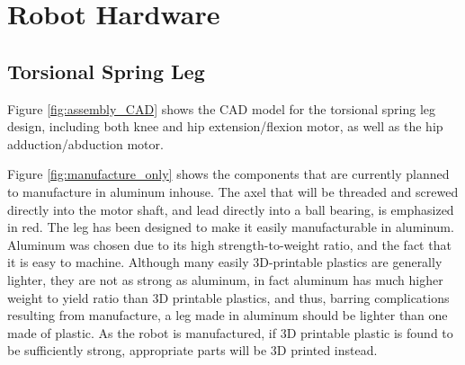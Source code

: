 \section{Robot Hardware}
\label{sec:robot_hardware}

\subsection{Torsional Spring Leg}
\label{sec:torsional_spring_leg}

Figure \ref{fig:assembly_CAD} shows the CAD model for the torsional spring leg design, including both knee and hip extension/flexion motor, as well as the hip adduction/abduction motor. 

Figure \ref{fig:manufacture_only} shows the components that are currently planned to manufacture in aluminum inhouse. The axel that will be threaded and screwed directly into the motor shaft, and lead directly into a ball bearing, is emphasized in red. The leg has been designed to make it easily manufacturable in aluminum. Aluminum was chosen due to its high strength-to-weight ratio, and the fact that it is easy to machine. Although many easily 3D-printable plastics are generally lighter, they are not as strong as aluminum, in fact aluminum has much higher weight to yield ratio than 3D printable plastics, and thus, barring complications resulting from manufacture, a leg made in aluminum should be lighter than one made of plastic. As the robot is manufactured, if 3D printable plastic is found to be sufficiently strong, appropriate parts will be 3D printed instead. 

